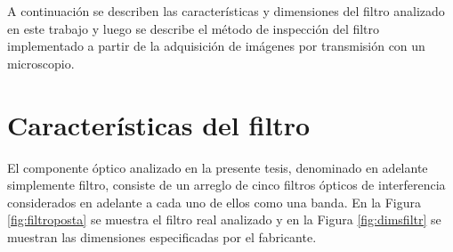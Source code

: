  A continuación se describen las características y dimensiones del filtro analizado en este trabajo y luego se describe el método de inspección del filtro implementado a partir de la adquisición de imágenes por transmisión con un microscopio.
 
\singlespacing
\section{Características del filtro}
\label{sec:carfilt}

\hspace{0.5cm}El componente óptico analizado en la presente tesis, denominado en adelante simplemente filtro, consiste de un arreglo de cinco filtros ópticos de interferencia  considerados en adelante a cada uno de ellos como una banda. En la Figura \ref{fig:filtroposta} se muestra el filtro real analizado y en la Figura \ref{fig:dimsfiltr} se muestran las dimensiones especificadas por el fabricante.
